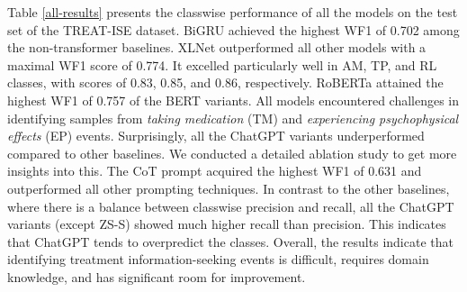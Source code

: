 \documentclass[letterpaper]{article} %
\begin{document}





Table \ref{all-results} presents the classwise performance of all the models on the test set of the TREAT-ISE dataset. BiGRU achieved the highest WF1 of 0.702 among the non-transformer baselines. XLNet outperformed all other models with a maximal WF1 score of 0.774. It excelled particularly well in AM, TP, and RL classes, with scores of 0.83, 0.85, and 0.86, respectively. RoBERTa attained the highest WF1 of 0.757 of the BERT variants. All models encountered challenges in identifying samples from \textit{taking medication} (TM) and \textit{experiencing psychophysical effects} (EP) events. Surprisingly, all the ChatGPT variants underperformed compared to other baselines. We conducted a detailed ablation study to get more insights into this. The CoT prompt acquired the highest WF1 of 0.631 and outperformed all other prompting techniques. In contrast to the other baselines, where there is a balance between classwise precision
and recall, all the ChatGPT variants (except ZS-S) showed much higher recall than precision. This indicates
that ChatGPT tends to overpredict the classes. Overall, the results indicate that identifying treatment information-seeking events is difficult, requires domain knowledge, and has significant room for improvement.
\end{document}
